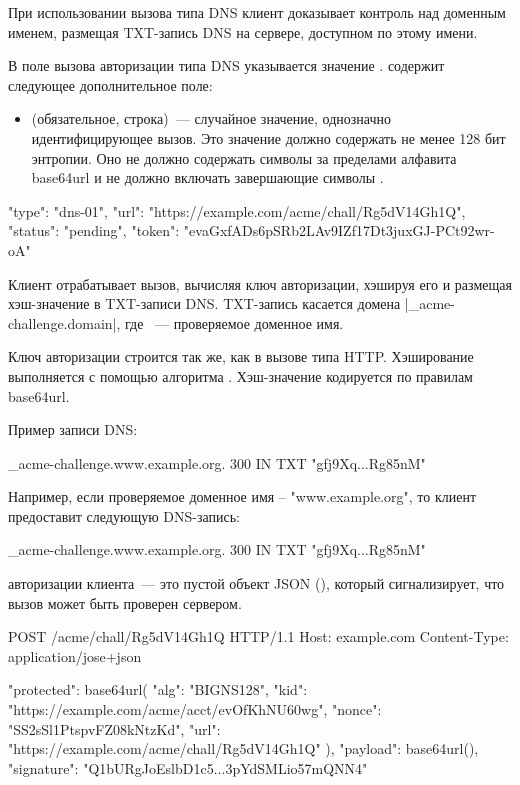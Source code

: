 При использовании вызова типа DNS клиент доказывает контроль над доменным 
именем, размещая TXT-запись DNS на сервере, доступном по этому имени.

В поле  вызова авторизации типа DNS указывается значение
.  содержит следующее 
дополнительное поле:

\begin{itemize}
\item
{} (обязательное, строка)~--- случайное значение, 
однозначно идентифицирующее вызов. Это значение должно 
содержать не менее 128 бит энтропии. Оно не должно содержать символы за 
пределами алфавита base64url и не должно включать завершающие символы \str{=}. 
\end{itemize}

\begin{codeblock}
{
  "type": "dns-01",
  "url": "https://example.com/acme/chall/Rg5dV14Gh1Q",
  "status": "pending",
  "token": "evaGxfADs6pSRb2LAv9IZf17Dt3juxGJ-PCt92wr-oA"
}
\end{codeblock}
\fi

Клиент отрабатывает вызов, вычисляя ключ авторизации, хэшируя
его и размещая хэш-значение в TXT-записи DNS.
TXT-запись касается домена \code|_acme-challenge.{domain}|, где 
~--- проверяемое доменное имя.

Ключ авторизации строится так же, как в вызове типа HTTP.
Хэширование выполняется с помощью алгоритма .
Хэш-значение кодируется по правилам base64url.

Пример записи DNS:

\begin{codeblock}
_acme-challenge.www.example.org. 300 IN TXT "gfj9Xq...Rg85nM"
\end{codeblock}

Например, если проверяемое доменное имя -- "www.example.org", то 
клиент предоставит следующую DNS-запись: 

\begin{codeblock}
_acme-challenge.www.example.org. 300 IN TXT "gfj9Xq...Rg85nM"
\end{codeblock}
\fi

 авторизации клиента~--- это пустой объект 
JSON (\sstr{\{\}}), который сигнализирует, что вызов может быть проверен 
сервером.

\begin{codeblock}
POST /acme/chall/Rg5dV14Gh1Q HTTP/1.1
Host: example.com
Content-Type: application/jose+json

{
  "protected": base64url({
    "alg": "BIGNS128",
    "kid": "https://example.com/acme/acct/evOfKhNU60wg",
    "nonce": "SS2sSl1PtspvFZ08kNtzKd",
    "url": "https://example.com/acme/chall/Rg5dV14Gh1Q"
  }),
  "payload": base64url({}),
  "signature": "Q1bURgJoEslbD1c5...3pYdSMLio57mQNN4"
}
\end{codeblock} 
\fi

